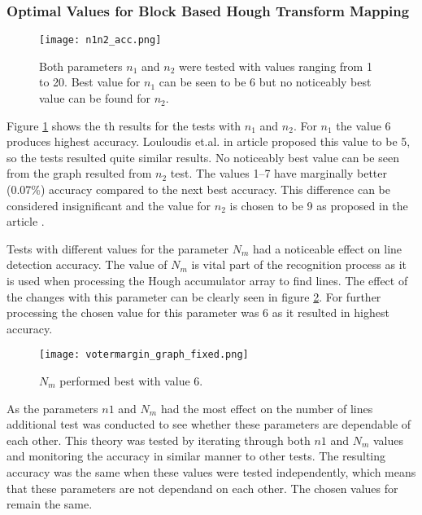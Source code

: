 \documentclass{article}
\begin{document}
    \subsubsection{Optimal Values for Block Based Hough Transform Mapping}

    \begin{figure}[!ht]
      \centering
      \texttt{[image: n1n2\_acc.png]}
      \caption{Both parameters $n_1$ and $n_2$ were tested with values ranging from 1 to 20. Best value for $n_1$ can be seen to be 6 but no noticeably best value can be found for $n_2$.
      \label{fig:n1n2}}
    \end{figure}

    Figure \ref{fig:n1n2} shows the th results for the tests with $n_1$ and $n_2$. For $n_1$ the value 6 produces highest accuracy. Louloudis et.al. in article \cite{Louloudis2} proposed this value to be 5, so the tests resulted quite similar results. No noticeably best value can be seen from the graph resulted from $n_2$ test. The values 1--7 have marginally better (0.07\%) accuracy compared to the next best accuracy. This difference can be considered insignificant and the value for $n_2$ is chosen to be 9 as proposed in the article \cite{Louloudis2}.

    Tests with different values for the parameter $N_m$ had a noticeable effect on line detection accuracy. The value of $N_m$ is vital part of the recognition process as it is used when processing the Hough accumulator array to find lines. The effect of the changes with this parameter can be clearly seen in figure \ref{fig:votermargin}. For further processing the chosen value for this parameter was 6 as it resulted in highest accuracy.

    \begin{figure}[!ht]
      \centering
      \texttt{[image: votermargin\_graph\_fixed.png]}
      \caption{$N_m$ performed best with value 6.
      \label{fig:votermargin}}
    \end{figure}

    As the parameters $n1$ and $N_m$ had the most effect on the number of lines additional test was conducted to see whether these parameters are dependable of each other. This theory was tested by iterating through both $n1$ and $N_m$ values and monitoring the accuracy in similar manner to other tests. The resulting accuracy was the same when these values were tested independently, which means that these parameters are not dependand on each other. The chosen values for remain the same.
\end{document}
